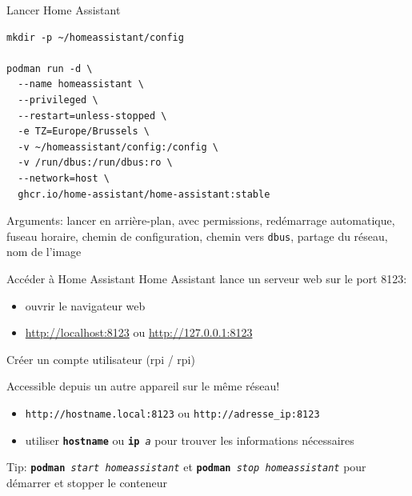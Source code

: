 \documentclass[
aspectratio=169 %
]{beamer}
\newcommand{\cmd}[1]{\texttt{\textbf{#1}}}
\newcommand{\args}[1]{\texttt{\textit{#1}}}
\begin{document}
\begin{frame}[fragile]{Lancer Home Assistant}

    \begin{lstlisting}
mkdir -p ~/homeassistant/config

podman run -d \ 
  --name homeassistant \
  --privileged \
  --restart=unless-stopped \
  -e TZ=Europe/Brussels \
  -v ~/homeassistant/config:/config \
  -v /run/dbus:/run/dbus:ro \
  --network=host \
  ghcr.io/home-assistant/home-assistant:stable
    \end{lstlisting}

    \medskip
    Arguments: lancer en arrière-plan, avec permissions, redémarrage
    automatique,
    fuseau horaire, chemin de configuration, chemin vers \texttt{dbus}, partage
    du réseau, nom de l'image
\end{frame}

\begin{frame}{Accéder à Home Assistant}
    Home Assistant lance un serveur web sur le port 8123:
    \begin{itemize}
        \item ouvrir le navigateur web
        \item \url{http://localhost:8123} ou \url{http://127.0.0.1:8123}
    \end{itemize}

    \bigskip

    Créer un compte utilisateur (rpi / rpi)

    \bigskip

    \alert{Accessible depuis un autre appareil sur le même réseau!}

    \begin{itemize}
        \item \texttt{http://hostname.local:8123} ou
              \texttt{http://adresse\_ip:8123}
        \item utiliser \cmd{hostname} ou \cmd{ip}\args{ a} pour trouver les
              informations nécessaires
    \end{itemize}

    \bigskip
    \alert{Tip}: \cmd{podman}\args{ start homeassistant} et
    \cmd{podman}\args{ stop homeassistant} pour démarrer et stopper le conteneur
\end{frame}
\end{document}
